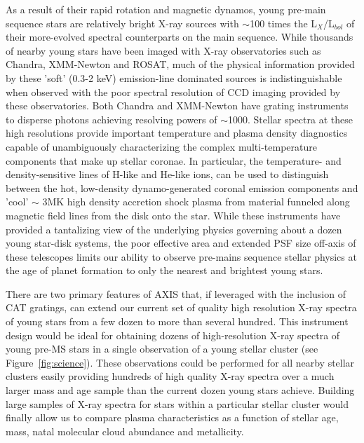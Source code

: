 \documentclass[12pt]{spieman}  %
\begin{document}
\begin{spacing}{1}
As a result of their rapid rotation and magnetic dynamos, young pre-main sequence stars are relatively bright X-ray sources with $\sim$100 times the L$_{X}$/L$_{bol}$ of their more-evolved spectral counterparts on the main sequence. While thousands of nearby young stars have been imaged with X-ray observatories such as Chandra, XMM-Newton and ROSAT, much of the physical information provided by these 'soft' (0.3-2 keV) emission-line dominated sources is indistinguishable when observed with the poor spectral resolution of CCD imaging provided by these observatories. Both Chandra and XMM-Newton have grating instruments to disperse photons achieving resolving powers of $\sim$1000.  Stellar spectra at these high resolutions provide important temperature and plasma density diagnostics capable of unambiguously characterizing the complex multi-temperature components that make up stellar coronae\cite{2001ApJ...559.1135H}. In particular, the temperature- and density-sensitive lines of H-like and He-like ions, can be used to distinguish between the hot, low-density dynamo-generated coronal emission components and 'cool' $\sim$ 3MK high density accretion shock plasma from material funneled along magnetic field lines from the disk onto the star\cite{2002ApJ...567..434K}.  While these instruments have provided a tantalizing view of the underlying physics governing about a dozen young star-disk systems, the poor effective area and extended PSF size off-axis of these telescopes limits our ability to observe pre-mains sequence stellar physics at the age of planet formation to only the nearest and brightest young stars\cite{2002ApJ...567..434K,2006A&A...459L..29G,2007ApJ...671..592H,2007A&A...468..443T}.


There are two primary features of AXIS that, if leveraged with the inclusion of CAT gratings, can extend our current set of quality high resolution X-ray spectra of young stars from a few dozen to more than several hundred. This instrument design would be ideal for obtaining dozens of high-resolution X-ray spectra of young pre-MS stars in a single observation of a young stellar cluster (see Figure~\ref{fig:science}). These observations could be performed for all nearby stellar clusters easily providing hundreds of high quality X-ray spectra over a much larger mass and age sample than the current dozen young stars achieve. Building large samples of X-ray spectra for stars within a particular stellar cluster would finally allow us to compare plasma characteristics as a function of stellar age, mass, natal molecular cloud abundance and metallicity.


\end{spacing}
\end{document}
